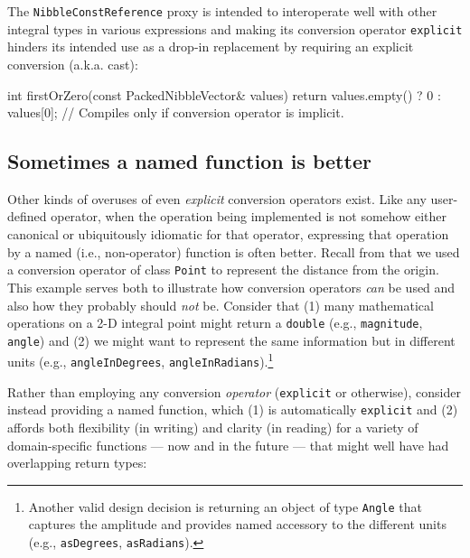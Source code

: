 \noindent The \lstinline!NibbleConstReference! proxy is intended to interoperate well with other integral types in various expressions and making its conversion operator \lstinline!explicit! hinders its intended use as a drop-in replacement by requiring an explicit conversion (a.k.a. cast):

\begin{emcppslisting}[emcppsbatch=e3]
int firstOrZero(const PackedNibbleVector& values)
{
    return values.empty() 
        ? 0 
        : values[0]; // Compiles only if conversion operator is implicit.
}
\end{emcppslisting}


\subsection[Sometimes a named function is better]{Sometimes a named function is better}\label{sometimes-a-named-function-is-better}

Other kinds of overuses of even \emph{explicit} conversion
operators exist. Like any user-defined operator, when the operation being
implemented is not somehow either canonical or ubiquitously idiomatic
for that operator, expressing that operation by a
named (i.e., non-operator) function is often better. Recall from  
that we used a conversion operator of
class \lstinline!Point! to represent the distance from the origin. This
example serves both to illustrate how conversion operators \emph{can} be
used and also how they probably should \emph{not} be. Consider that (1)
many mathematical operations on a 2-D integral point might return a \lstinline!double! (e.g., \lstinline!magnitude!,
\lstinline!angle!) and (2) we might want to represent the same
information but in different units (e.g., \lstinline!angleInDegrees!,
\lstinline!angleInRadians!).{\cprotect\footnote{Another valid design
decision is returning an object of type \lstinline!Angle! that captures
the amplitude and provides named accessory to the different units
  (e.g., \lstinline!asDegrees!, \lstinline!asRadians!).}}

Rather than employing any conversion \emph{operator} (\lstinline!explicit!
or otherwise), consider instead providing a named function, which (1) is
automatically \lstinline!explicit! and (2) affords both flexibility (in
writing) and clarity (in reading) for a variety of domain-specific
functions --- now and in the future --- that might well have had
overlapping return types:

